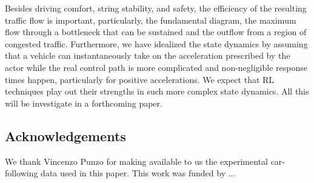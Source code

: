\documentclass[review]{elsarticle}
\providecommand{\martin}[1]{#1}                  %
\providecommand{\martinc}[1]{}                  %
\providecommand{\3}{{\ss}}
\begin{document}
\martin{Besides driving comfort, string stability, and safety,
  the efficiency of the resulting traffic flow is important,
  particularly, the fundamental diagram, the maximum flow through a
  bottleneck that can be 
  sustained and the outflow from a region of congested
  traffic. Furthermore, we have idealized the state dynamics by
  assuming that a vehicle can instantaneously take on the acceleration
  prescribed by the actor while the real control path is more
  complicated and non-negligible response times happen, particularly
  for positive accelerations. We expect that RL techniques play out
  their strengths in such more complex state dynamics. All this  will
  be investigate in a forthcoming paper.
}

\martin{
\subsection*{Acknowledgements}
We thank Vincenzo Punzo for making available to us the experimental
car-following data used in this paper. This work was funded by ...}
\martinc{Ostap: DFG oder andere funds nennen?}






\end{document}
